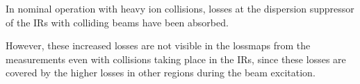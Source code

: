 In nominal operation with heavy ion collisions, losses at the dispersion suppressor of the IRs with colliding beams have been absorbed. 

However, these increased losses are not visible in the lossmaps from the measurements even with collisions taking place in the IRs, since these losses are covered by the higher losses in other regions during the beam excitation.

